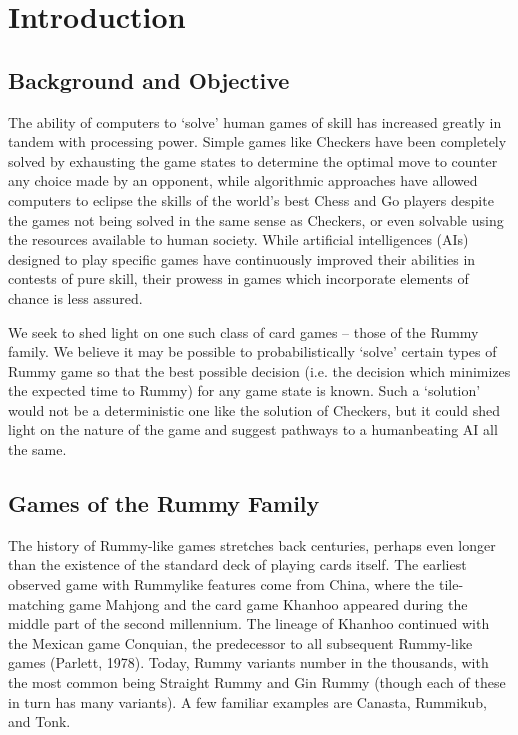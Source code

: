 \documentclass[paper=a4, fontsize=11pt,twoside]{report}   %
\begin{document}
\chapter{Introduction}

\section{Background and Objective}
\doublespacing
The ability of computers to ‘solve’ human games of skill has increased greatly in tandem with processing power. Simple games like Checkers have been completely solved by exhausting the game states to determine the optimal move to counter any choice made by an opponent, while algorithmic approaches have allowed computers to eclipse the skills of the world’s best Chess and Go players despite the games not being solved in the same sense as Checkers, or even solvable using the resources available to human society. While artificial intelligences (AIs) designed to play specific games have continuously improved their abilities in contests of pure skill, their prowess in games which incorporate elements of chance is less assured.
 
We seek to shed light on one such class of card games – those of the Rummy family. We believe it may be possible to probabilistically ‘solve’ certain types of Rummy game so that the best possible decision (i.e. the decision which minimizes the expected time to Rummy) for any game state is known. Such a ‘solution’ would not be a deterministic one like the solution of Checkers, but it could shed light on the nature of the game and suggest pathways to a humanbeating AI all the same. 
 
\section{Games of the Rummy Family}

The history of Rummy-like games stretches back centuries, perhaps even longer than the existence of the standard deck of playing cards itself. The earliest observed game with Rummylike features come from China, where the tile-matching game Mahjong and the card game Khanhoo appeared during the middle part of the second millennium. The lineage of Khanhoo  continued with the Mexican game Conquian, the predecessor to all subsequent Rummy-like games (Parlett, 1978). Today, Rummy variants number in the thousands, with the most common being Straight Rummy and Gin Rummy (though each of these in turn has many variants). A few familiar examples are Canasta, Rummikub, and Tonk. \\
\end{document}
